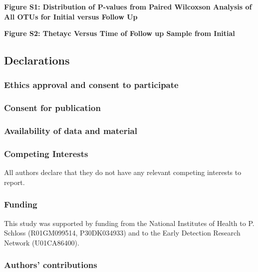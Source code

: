 \documentclass[12pt,]{article}
\begin{document}
\newpage

\textbf{Figure S1: Distribution of P-values from Paired Wilcoxson
Analysis of All OTUs for Initial versus Follow Up}

\textbf{Figure S2: Thetayc Versus Time of Follow up Sample from Initial}

\newpage

\subsection{Declarations}\label{declarations}

\subsubsection{Ethics approval and consent to
participate}\label{ethics-approval-and-consent-to-participate}

\subsubsection{Consent for publication}\label{consent-for-publication}

\subsubsection{Availability of data and
material}\label{availability-of-data-and-material}

\subsubsection{Competing Interests}\label{competing-interests}

All authors declare that they do not have any relevant competing
interests to report.

\subsubsection{Funding}\label{funding}

This study was supported by funding from the National Institutes of
Health to P. Schloss (R01GM099514, P30DK034933) and to the Early
Detection Research Network (U01CA86400).

\subsubsection{Authors' contributions}\label{authors-contributions}
\end{document}
